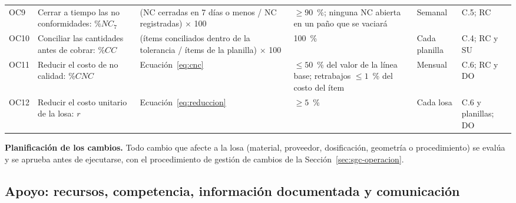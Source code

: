 \begin{longtable}{@{}P{0.85cm}P{3.1cm}P{4.4cm}P{2.5cm}P{1.75cm}P{2.45cm}@{}}
OC9 & Cerrar a tiempo las no conformidades: $\%NC_7$ & (NC cerradas en 7 días o menos / NC registradas) $\times$ 100 & $\geq 90$~\%; ninguna NC abierta en un paño que se vaciará & Semanal & C.5; RC \\
OC10 & Conciliar las cantidades antes de cobrar: $\%CC$ & (ítems conciliados dentro de la tolerancia / ítems de la planilla) $\times$ 100 & 100~\% & Cada planilla & C.4; RC y SU \\
OC11 & Reducir el costo de no calidad: $\%CNC$ & Ecuación~\eqref{eq:cnc} & $\leq 50$~\% del valor de la línea base; retrabajos $\leq 1$~\% del costo del ítem & Mensual & C.6; RC y DO \\
OC12 & Reducir el costo unitario de la losa: $r$ & Ecuación~\eqref{eq:reduccion} & $\geq 5$~\% & Cada losa & C.6 y planillas; DO \\
\end{longtable}
\vspace{-6pt}
\endgroup

\textbf{Planificación de los cambios.} Todo cambio que afecte a la losa (material, proveedor, dosificación, geometría o procedimiento) se evalúa y se aprueba antes de ejecutarse, con el procedimiento de gestión de cambios de la Sección~\ref{sec:sgc-operacion}.

\subsection{Apoyo: recursos, competencia, información documentada y comunicación}
\label{sec:sgc-apoyo}

